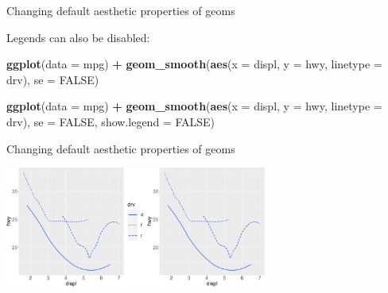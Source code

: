 \documentclass[ignorenonframetext,]{beamer}
\newenvironment{Shaded}{\begin{snugshade}}{\end{snugshade}}
\newcommand{\DataTypeTok}[1]{\textcolor[rgb]{0.13,0.29,0.53}{#1}}
\newcommand{\KeywordTok}[1]{\textcolor[rgb]{0.13,0.29,0.53}{\textbf{#1}}}
\newcommand{\NormalTok}[1]{#1}
\newcommand{\OperatorTok}[1]{\textcolor[rgb]{0.81,0.36,0.00}{\textbf{#1}}}
\newcommand{\OtherTok}[1]{\textcolor[rgb]{0.56,0.35,0.01}{#1}}
\newcommand{\StringTok}[1]{\textcolor[rgb]{0.31,0.60,0.02}{#1}}
\begin{document}
\begin{frame}[fragile]{Changing default aesthetic properties of geoms}
\protect\hypertarget{changing-default-aesthetic-properties-of-geoms-34}{}

Legends can also be disabled:

\begin{Shaded}
\begin{Highlighting}[]
\KeywordTok{ggplot}\NormalTok{(}\DataTypeTok{data =}\NormalTok{ mpg) }\OperatorTok{+}\StringTok{ }
\StringTok{  }\KeywordTok{geom_smooth}\NormalTok{(}\KeywordTok{aes}\NormalTok{(}\DataTypeTok{x =}\NormalTok{ displ, }\DataTypeTok{y =}\NormalTok{ hwy, }\DataTypeTok{linetype =}\NormalTok{ drv),}
    \DataTypeTok{se =} \OtherTok{FALSE}\NormalTok{)}

\KeywordTok{ggplot}\NormalTok{(}\DataTypeTok{data =}\NormalTok{ mpg) }\OperatorTok{+}\StringTok{ }
\StringTok{  }\KeywordTok{geom_smooth}\NormalTok{(}\KeywordTok{aes}\NormalTok{(}\DataTypeTok{x =}\NormalTok{ displ, }\DataTypeTok{y =}\NormalTok{ hwy, }\DataTypeTok{linetype =}\NormalTok{ drv),}
    \DataTypeTok{se =} \OtherTok{FALSE}\NormalTok{, }\DataTypeTok{show.legend =} \OtherTok{FALSE}\NormalTok{)}
\end{Highlighting}
\end{Shaded}

\end{frame}

\begin{frame}{Changing default aesthetic properties of geoms}
\protect\hypertarget{changing-default-aesthetic-properties-of-geoms-35}{}

\begin{center}\includegraphics[height=150px]{data-visualization_files/figure-beamer/unnamed-chunk-67-1} \end{center}

\end{frame}
\end{document}
